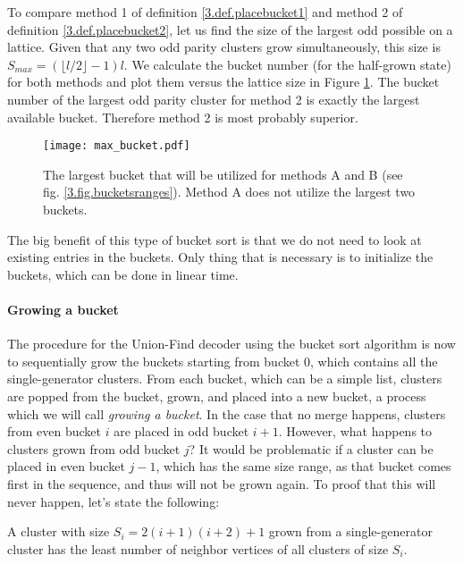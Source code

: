 To compare method 1 of definition \ref{3.def.placebucket1} and method 2 of definition \ref{3.def.placebucket2}, let us find the size of the largest odd possible on a lattice. Given that any two odd parity clusters grow simultaneously, this size is $S_{max} = (\lfloor l/2\rfloor-1)l$. We calculate the bucket number (for the half-grown state) for both methods and plot them versus the lattice size in Figure \ref{3.fig.maxbucket}. The bucket number of the largest odd parity cluster for method 2 is exactly the largest available bucket. Therefore method 2 is most probably superior.

\begin{figure}[h]
  \centering
  \texttt{[image: max\_bucket.pdf]}
  \caption{The largest bucket that will be utilized for methods A and B (see fig. \ref{3.fig.bucketsranges}). Method A does not utilize the largest two buckets. }\label{3.fig.maxbucket}
\end{figure}

The big benefit of this type of bucket sort is that we do not need to look at existing entries in the buckets. Only thing that is necessary is to initialize the buckets, which can be done in linear time.

\paragraph{Growing a bucket}

The procedure for the Union-Find decoder using the bucket sort algorithm is now to sequentially grow the buckets starting from bucket 0, which contains all the single-generator clusters. From each bucket, which can be a simple list, clusters are popped from the bucket, grown, and placed into a new bucket, a process which we will call \emph{growing a bucket}. In the case that no merge happens, clusters from even bucket $i$ are placed in odd bucket $i+1$. However, what happens to clusters grown from odd bucket $j$? It would be problematic if a cluster can be placed in even bucket $j-1$, which has the same size range, as that bucket comes first in the sequence, and thus will not be grown again. To proof that this will never happen, let's state the following:

\begin{lemma}
  A cluster with size $S_i = 2(i+1)(i+2) + 1$ grown from a single-generator cluster has the least number of neighbor vertices of all clusters of size $S_i$.
\end{lemma}

